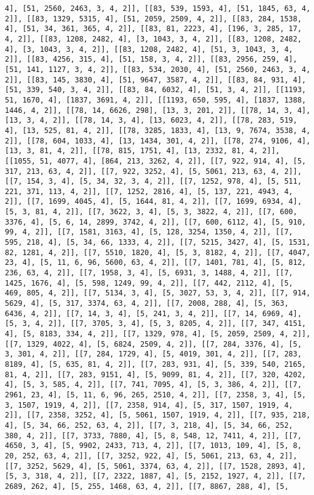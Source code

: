 \documentclass[12pt,fleqn]{article}\usepackage{../../common}
\begin{document}
\begin{verbatim}
4], [51, 2560, 2463, 3, 4, 2]], [[83, 539, 1593, 4], [51, 1845, 63, 4, 2]], [[83, 1329, 5315, 4], [51, 2059, 2509, 4, 2]], [[83, 284, 1538, 4], [51, 34, 361, 365, 4, 2]], [[83, 81, 2223, 4], [196, 3, 285, 17, 4, 2]], [[83, 1208, 2482, 4], [3, 1043, 3, 4, 2]], [[83, 1208, 2482, 4], [3, 1043, 3, 4, 2]], [[83, 1208, 2482, 4], [51, 3, 1043, 3, 4, 2]], [[83, 4256, 315, 4], [51, 158, 3, 4, 2]], [[83, 2956, 259, 4], [51, 141, 1127, 3, 4, 2]], [[83, 534, 2030, 4], [51, 2560, 2463, 3, 4, 2]], [[83, 145, 3830, 4], [51, 9647, 3587, 4, 2]], [[83, 84, 931, 4], [51, 339, 540, 3, 4, 2]], [[83, 84, 6032, 4], [51, 3, 4, 2]], [[1193, 51, 1670, 4], [1837, 3691, 4, 2]], [[1193, 650, 595, 4], [1837, 1388, 1446, 4, 2]], [[78, 14, 6626, 298], [13, 3, 201, 2]], [[78, 14, 3, 4], [13, 3, 4, 2]], [[78, 14, 3, 4], [13, 6023, 4, 2]], [[78, 283, 519, 4], [13, 525, 81, 4, 2]], [[78, 3285, 1833, 4], [13, 9, 7674, 3538, 4, 2]], [[78, 604, 1033, 4], [13, 1434, 301, 4, 2]], [[78, 274, 9106, 4], [13, 3, 81, 4, 2]], [[78, 815, 1751, 4], [13, 2332, 81, 4, 2]], [[1055, 51, 4077, 4], [864, 213, 3262, 4, 2]], [[7, 922, 914, 4], [5, 317, 213, 63, 4, 2]], [[7, 922, 3252, 4], [5, 5061, 213, 63, 4, 2]], [[7, 154, 3, 4], [5, 34, 32, 3, 4, 2]], [[7, 1252, 978, 4], [5, 511, 221, 371, 113, 4, 2]], [[7, 1252, 2816, 4], [5, 137, 221, 4943, 4, 2]], [[7, 1699, 4045, 4], [5, 1644, 81, 4, 2]], [[7, 1699, 6934, 4], [5, 3, 81, 4, 2]], [[7, 3622, 3, 4], [5, 3, 3822, 4, 2]], [[7, 600, 3376, 4], [5, 6, 14, 2899, 3742, 4, 2]], [[7, 600, 6112, 4], [5, 910, 99, 4, 2]], [[7, 1581, 3163, 4], [5, 128, 3254, 1350, 4, 2]], [[7, 595, 218, 4], [5, 34, 66, 1333, 4, 2]], [[7, 5215, 3427, 4], [5, 1531, 82, 1281, 4, 2]], [[7, 5510, 1820, 4], [5, 3, 8182, 4, 2]], [[7, 4047, 23, 4], [5, 11, 6, 96, 5600, 63, 4, 2]], [[7, 1401, 781, 4], [5, 812, 236, 63, 4, 2]], [[7, 1958, 3, 4], [5, 6931, 3, 1488, 4, 2]], [[7, 1425, 1676, 4], [5, 598, 1249, 99, 4, 2]], [[7, 442, 2112, 4], [5, 469, 805, 4, 2]], [[7, 5134, 3, 4], [5, 3027, 53, 3, 4, 2]], [[7, 914, 5629, 4], [5, 317, 3374, 63, 4, 2]], [[7, 2008, 288, 4], [5, 363, 6436, 4, 2]], [[7, 14, 3, 4], [5, 241, 3, 4, 2]], [[7, 14, 6969, 4], [5, 3, 4, 2]], [[7, 3705, 3, 4], [5, 3, 8205, 4, 2]], [[7, 347, 4151, 4], [5, 8183, 334, 4, 2]], [[7, 1329, 978, 4], [5, 2059, 2509, 4, 2]], [[7, 1329, 4022, 4], [5, 6824, 2509, 4, 2]], [[7, 284, 3376, 4], [5, 3, 301, 4, 2]], [[7, 284, 1729, 4], [5, 4019, 301, 4, 2]], [[7, 283, 8189, 4], [5, 635, 81, 4, 2]], [[7, 283, 931, 4], [5, 339, 540, 2165, 81, 4, 2]], [[7, 283, 9151, 4], [5, 9099, 81, 4, 2]], [[7, 320, 4202, 4], [5, 3, 585, 4, 2]], [[7, 741, 7095, 4], [5, 3, 386, 4, 2]], [[7, 2961, 23, 4], [5, 11, 6, 96, 265, 2510, 4, 2]], [[7, 2358, 3, 4], [5, 3, 1507, 1919, 4, 2]], [[7, 2358, 914, 4], [5, 317, 1507, 1919, 4, 2]], [[7, 2358, 3252, 4], [5, 5061, 1507, 1919, 4, 2]], [[7, 935, 218, 4], [5, 34, 66, 252, 63, 4, 2]], [[7, 3, 218, 4], [5, 34, 66, 252, 380, 4, 2]], [[7, 3733, 7880, 4], [5, 8, 548, 12, 7411, 4, 2]], [[7, 4650, 3, 4], [5, 9902, 2433, 713, 4, 2]], [[7, 1013, 109, 4], [5, 8, 20, 252, 63, 4, 2]], [[7, 3252, 922, 4], [5, 5061, 213, 63, 4, 2]], [[7, 3252, 5629, 4], [5, 5061, 3374, 63, 4, 2]], [[7, 1528, 2893, 4], [5, 3, 318, 4, 2]], [[7, 2322, 1887, 4], [5, 2152, 1927, 4, 2]], [[7, 2689, 262, 4], [5, 255, 1468, 63, 4, 2]], [[7, 8867, 288, 4], [5, 
\end{verbatim}
\end{document}
